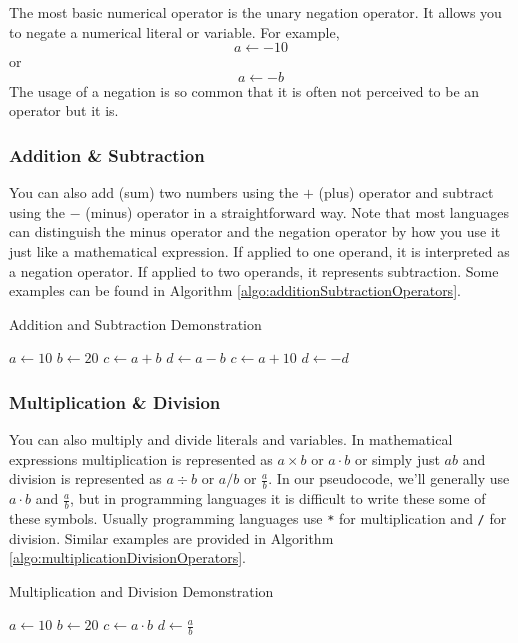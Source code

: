 The most basic numerical operator is the unary negation operator.  It allows you to
negate a numerical literal or variable.  For example, 
  $$a \leftarrow -10$$
or
  $$a \leftarrow -b$$
The usage of a negation is so common that it is often not perceived to be an
operator but it is.

\subsubsection{Addition \& Subtraction}

You can also add (sum) two numbers using the $+$ (plus) operator and
subtract using the $-$ (minus) operator in a straightforward way.  Note that
most languages can distinguish the minus operator and the negation operator
by how you use it just like a mathematical expression.  If applied to one operand, it
is interpreted as a negation operator.  If applied to two operands, it represents
subtraction.  Some examples can be found in Algorithm \ref{algo:additionSubtractionOperators}.

\begin{algorithm}[H]
\caption{Addition and Subtraction Demonstration}
\label{algo:additionSubtractionOperators}
$a \leftarrow 10$ \;
$b \leftarrow 20$ \;
$c \leftarrow a + b$ \;
$d \leftarrow a - b$ \;
$c \leftarrow a + 10$ \;
$d \leftarrow -d$ \;
\end{algorithm}

\subsubsection{Multiplication \& Division}

You can also multiply and divide literals and variables.  In mathematical 
expressions multiplication is represented as $a \times b$ or $a \cdot b$ or 
simply just $ab$ and division is represented as $a \div b$ or $a / b$ or 
$\frac{a}{b}$.  In our pseudocode, we'll generally use $a\cdot b$ and 
$\frac{a}{b}$, but in programming languages it is difficult to write these 
some of these symbols. Usually programming languages use \texttt{*}
for multiplication and \texttt{/} for division.  Similar examples are
provided in Algorithm \ref{algo:multiplicationDivisionOperators}.

\begin{algorithm}[H]
\caption{Multiplication and Division Demonstration}
\label{algo:multiplicationDivisionOperators}
$a \leftarrow 10$ \;
$b \leftarrow 20$ \;
$c \leftarrow a \cdot b$ \;
$d \leftarrow \frac{a}{b}$ \;
\end{algorithm}

